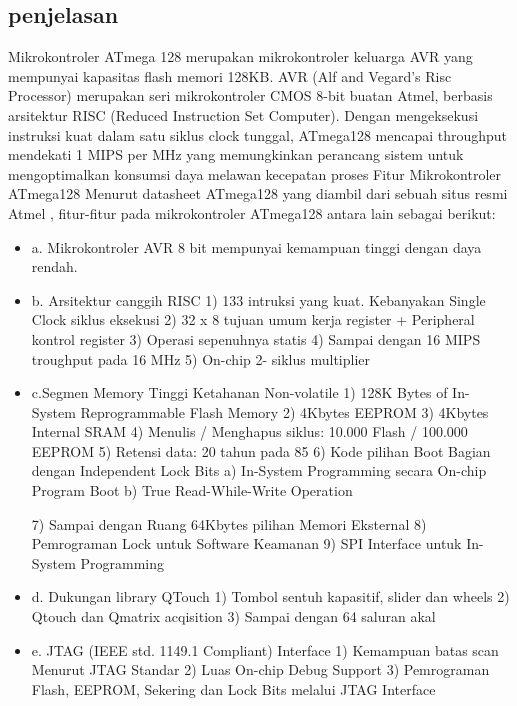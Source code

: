 	\subsection{penjelasan}
	Mikrokontroler ATmega 128 merupakan mikrokontroler keluarga AVR yang mempunyai kapasitas flash memori 128KB. AVR (Alf and Vegard’s Risc Processor) merupakan seri mikrokontroler CMOS 8-bit buatan Atmel, berbasis arsitektur RISC (Reduced Instruction Set Computer). Dengan mengeksekusi instruksi kuat dalam satu siklus clock tunggal, ATmega128 mencapai throughput mendekati 1 MIPS per MHz yang memungkinkan perancang sistem untuk mengoptimalkan konsumsi daya melawan kecepatan proses
	Fitur Mikrokontroler ATmega128
	Menurut datasheet ATmega128 yang diambil dari sebuah situs resmi Atmel , fitur-fitur pada mikrokontroler ATmega128 antara lain sebagai berikut:
	\begin{itemize}
		\item a. Mikrokontroler AVR 8 bit mempunyai kemampuan tinggi dengan daya rendah. 
		\item b. Arsitektur canggih RISC
				1) 133 intruksi yang kuat. Kebanyakan Single Clock siklus eksekusi 
				2) 32 x 8 tujuan umum kerja register + Peripheral kontrol register 
				3) Operasi sepenuhnya statis 
				4) Sampai dengan 16 MIPS troughput pada 16 MHz
				5) On-chip 2- siklus multiplier
		\item c.Segmen Memory Tinggi Ketahanan Non-volatile 
				1) 128K Bytes of In-System Reprogrammable Flash Memory
				2) 4Kbytes EEPROM
				3) 4Kbytes Internal SRAM
				4) Menulis / Menghapus siklus: 10.000 Flash / 100.000 EEPROM 
				5) Retensi data: 20 tahun pada 85 
				6) Kode pilihan Boot Bagian dengan Independent Lock Bits 
					a) In-System Programming secara On-chip Program Boot 
					b) True Read-While-Write Operation 
					
				7) Sampai dengan Ruang 64Kbytes pilihan Memori Eksternal
				8) Pemrograman Lock untuk Software Keamanan
				9) SPI Interface untuk In-System Programming
		\item d. Dukungan library QTouch
				1) Tombol sentuh kapasitif, slider dan wheels 
				2) Qtouch dan Qmatrix acqisition 
				3) Sampai dengan 64 saluran akal 
		\item e. JTAG (IEEE std. 1149.1 Compliant) Interface
				1) Kemampuan batas scan Menurut JTAG Standar
				2) Luas On-chip Debug Support 3) Pemrograman Flash, EEPROM, Sekering dan Lock Bits melalui  JTAG Interface

		\end{itemize}

	